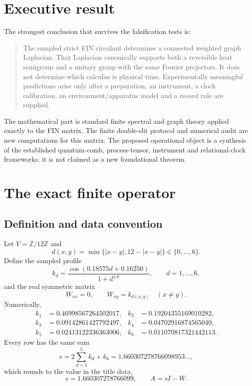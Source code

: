 \documentclass[11pt,a4paper]{article}
\theoremstyle{definition}
\theoremstyle{remark}
\newcommand{\Z}{\mathbb Z}
\begin{document}
\tableofcontents
\newpage

\section{Executive result}

The strongest conclusion that survives the falsification tests is:

\begin{quote}
The sampled strict FIN circulant determines a connected weighted graph Laplacian. That Laplacian canonically supports both a reversible heat semigroup and a unitary group with the same Fourier projectors. It does not determine which calculus is physical time. Experimentally meaningful predictions arise only after a preparation, an instrument, a clock calibration, an environment/apparatus model and a record rule are supplied.
\end{quote}

The mathematical part is standard finite spectral and graph theory applied exactly to the FIN matrix. The finite double-slit protocol and numerical audit are new computations for this matrix. The proposed operational object is a synthesis of the established quantum-comb, process-tensor, instrument and relational-clock frameworks; it is not claimed as a new foundational theorem.

\section{The exact finite operator}

\subsection{Definition and data convention}

Let $V=\Z/12\Z$ and
\[
 d(x,y)=\min\{|x-y|,12-|x-y|\}\in\{0,\ldots,6\}.
\]
Define the sampled profile
\[
 k_d=\frac{\cos(0.18575d+0.16250)}{1+d^{1.8}},\qquad d=1,\ldots,6,
\]
and the real symmetric matrix
\[
 W_{xx}=0,\qquad W_{xy}=k_{d(x,y)}\quad(x\ne y).
\]
Numerically,
\begin{equation}
\begin{aligned}
k_1&=0.46998567264502017,& k_2&=0.19204355169010282,\\
k_3&=0.09142861427792497,& k_4&=0.04702916874565040,\\
k_5&=0.02413122336363006,& k_6&=0.011070817321442113.
\end{aligned}
\end{equation}
Every row has the same sum
\[
 s=2\sum_{d=1}^{5}k_d+k_6=1.660307278766098953\ldots,
\]
which rounds to the value in the title data,
\[
 \boxed{s=1.660307278766099},\qquad \boxed{A=sI-W}.
\]
\end{document}
